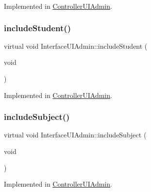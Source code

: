 Implemented in \hyperlink{class_controller_u_i_admin_a9867df3728ad7e8c663a3b999e96a441}{Controller\+U\+I\+Admin}.

\mbox{\label{class_interface_u_i_admin_a1fe189d6258d112e4165f69f5326752d}} 
\subsubsection{\texorpdfstring{include\+Student()}{includeStudent()}}
{\footnotesize\ttfamily virtual void Interface\+U\+I\+Admin\+::include\+Student (\begin{DoxyParamCaption}\item[{void}]{ }\end{DoxyParamCaption})\hspace{0.3cm}{\ttfamily [pure virtual]}}



Implemented in \hyperlink{class_controller_u_i_admin_abe57cd3860f99ae9ee0023bdb9ccd6b1}{Controller\+U\+I\+Admin}.

\mbox{\label{class_interface_u_i_admin_aeb5d10fa8f9633ed73e52bb61d10f40a}} 
\subsubsection{\texorpdfstring{include\+Subject()}{includeSubject()}}
{\footnotesize\ttfamily virtual void Interface\+U\+I\+Admin\+::include\+Subject (\begin{DoxyParamCaption}\item[{void}]{ }\end{DoxyParamCaption})\hspace{0.3cm}{\ttfamily [pure virtual]}}



Implemented in \hyperlink{class_controller_u_i_admin_a7c31484c26788da7ea3d551bbf9f82f8}{Controller\+U\+I\+Admin}.

\mbox{\label{class_interface_u_i_admin_a819252ab207a578d42807db748f867cd}} 
